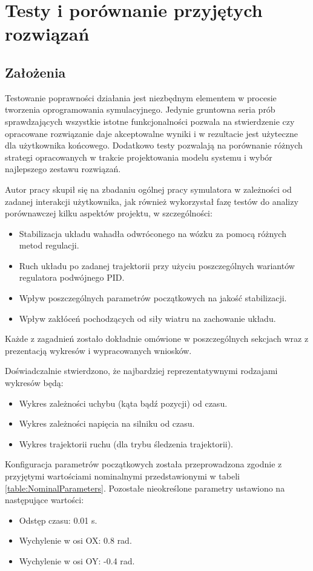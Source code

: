 \documentclass[12pt, oneside]{report}
\theoremstyle{definition}
\begin{document}
\chapter{Testy i porównanie przyjętych rozwiązań}
\section{Założenia}
Testowanie poprawności działania jest niezbędnym elementem w procesie tworzenia oprogramowania symulacyjnego. Jedynie gruntowna seria prób sprawdzających wszystkie istotne funkcjonalności pozwala na stwierdzenie czy opracowane rozwiązanie daje akceptowalne wyniki i w rezultacie jest użyteczne dla użytkownika końcowego. Dodatkowo testy pozwalają na porównanie różnych strategi opracowanych w trakcie projektowania modelu systemu i wybór najlepszego zestawu rozwiązań. 

Autor pracy skupił się na zbadaniu ogólnej pracy symulatora w zależności od zadanej interakcji użytkownika, jak również wykorzystał fazę testów do analizy porównawczej kilku aspektów projektu, w szczególności:
\begin{itemize}
\item Stabilizacja układu wahadła odwróconego na wózku za pomocą różnych metod regulacji.
\item Ruch układu po zadanej trajektorii przy użyciu poszczególnych wariantów regulatora podwójnego PID.
\item Wpływ poszczególnych parametrów początkowych na jakość stabilizacji.
\item Wpływ zakłóceń pochodzących od siły wiatru na zachowanie układu.
\end{itemize}

Każde z zagadnień zostało dokładnie omówione w poszczególnych sekcjach wraz z prezentacją wykresów i wypracowanych wniosków. 

Doświadczalnie stwierdzono, że najbardziej reprezentatywnymi rodzajami wykresów będą:
\begin{itemize}
\item Wykres zależności uchybu (kąta bądź pozycji) od czasu.
\item Wykres zależności napięcia na silniku od czasu.
\item Wykres trajektorii ruchu (dla trybu śledzenia trajektorii).
\end{itemize}

Konfiguracja parametrów początkowych została przeprowadzona zgodnie z przyjętymi wartościami nominalnymi przedstawionymi w tabeli \ref{table:NominalParameters}. Pozostałe nieokreślone parametry ustawiono na następujące wartości:
\begin{itemize}
\item Odstęp czasu: 0.01 s.
\item Wychylenie w osi OX: 0.8 rad.
\item Wychylenie w osi OY: -0.4 rad.
\end{itemize}
\end{document}
